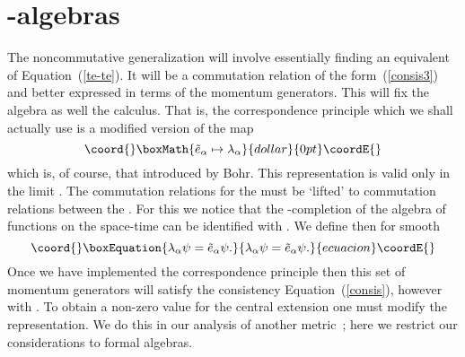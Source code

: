 \documentclass[12pt,a4paper]{article}
\newcounter{eg}
\def\t#1{\tilde #1}
\def\b#1{{\mathbb #1}}
\def\c#1{{\cal #1}}
\def\kbar{{\mathchar'26\mkern-9muk}}
\providecommand{\initiate}{\setcounter{equation}{0}}
\begin{document}
\initiate
\section{\coordHE{}-algebras}

The noncommutative generalization will involve essentially finding an
equivalent of Equation~(\ref{te-te}). It will be a commutation
relation of the form~(\ref{consis3}) and better expressed in terms of
the momentum generators. This will fix the algebra as well the
calculus. That is, the correspondence principle which we shall
actually use is a modified version of the map
$$\coord{}\boxMath{
\t{e}_\alpha \mapsto \lambda_\alpha
}{dollar}{0pt}\coordE{}$$
which is, of course, that introduced by Bohr.  This representation
is valid only in the limit \myHighlight{$\kbar \to \infty$}\coordHE{}.  The commutation
relations for the \myHighlight{$\t{e}_\alpha$}\coordHE{} must be `lifted' to commutation
relations between the \myHighlight{$\lambda_\alpha$}\coordHE{}. For this we notice that the
\coordHE{}-completion of the algebra of functions on the space-time can be
identified with \myHighlight{$\c{H} = L^2(\b{R}^4)$}\coordHE{}. We define then for smooth
\myHighlight{$\psi \in \c{H}$}\coordHE{}
\begin{equation}\coord{}\boxEquation{
\lambda_\alpha \psi = \t{e}_\alpha \psi.                 \label{repres}
}{
\lambda_\alpha \psi = \t{e}_\alpha \psi.                 }{ecuacion}\coordE{}\end{equation}
Once we have implemented the correspondence principle then this set of
momentum generators will satisfy the consistency
Equation~(\ref{consis}), however with \coordHE{}. To obtain a
non-zero value for the central extension one must modify the
representation. We do this in our analysis of another
metric~\cite{MacMadZou02}; here we restrict our considerations to formal
algebras. 
\end{document}
